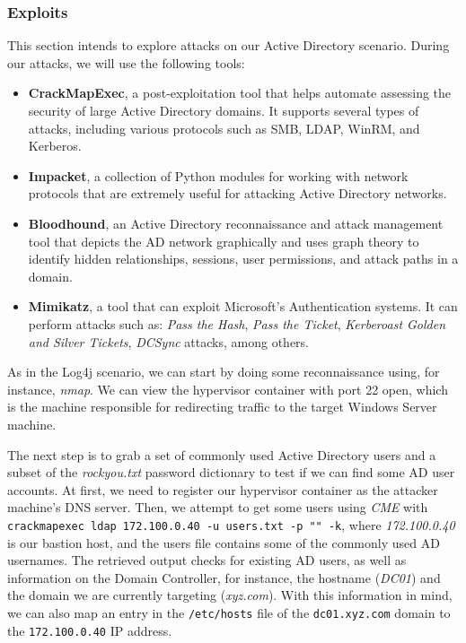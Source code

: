 \subsubsection{Exploits} \label{sec:validation_ad_exploit}

This section intends to explore attacks on our Active Directory scenario. During our attacks, we will use the following tools:

\begin{itemize}
    \item \textbf{CrackMapExec}, a post-exploitation tool that helps automate assessing the security of large Active Directory domains. It supports several types of attacks, including various protocols such as SMB, LDAP, WinRM, and Kerberos.
    \item \textbf{Impacket}, a collection of Python modules for working with network protocols that are extremely useful for attacking Active Directory networks.
    \item \textbf{Bloodhound}, an Active Directory reconnaissance and attack management tool that depicts the AD network graphically and uses graph theory to identify hidden relationships, sessions, user permissions, and attack paths in a domain.
    \item \textbf{Mimikatz}, a tool that can exploit Microsoft's Authentication systems. It can perform attacks such as: \textit{Pass the Hash}, \textit{Pass the Ticket}, \textit{Kerberoast Golden and Silver Tickets}, \textit{DCSync} attacks, among others. 
\end{itemize}

As in the Log4j scenario, we can start by doing some reconnaissance using, for instance, \textit{nmap}. We can view the hypervisor container with port 22 open, which is the machine responsible for redirecting traffic to the target Windows Server machine.

The next step is to grab a set of commonly used Active Directory users and a subset of the \textit{rockyou.txt} password dictionary to test if we can find some AD user accounts. At first, we need to register our hypervisor container as the attacker machine's DNS server. Then, we attempt to get some users using \textit{CME} with \texttt{crackmapexec ldap 172.100.0.40 -u users.txt -p "" -k}, where \textit{172.100.0.40} is our bastion host, and the users file contains some of the commonly used AD usernames. The retrieved output checks for existing AD users, as well as information on the Domain Controller, for instance, the hostname (\textit{DC01}) and the domain we are currently targeting (\textit{xyz.com}). With this information in mind, we can also map an entry in the \texttt{/etc/hosts} file of the \texttt{dc01.xyz.com} domain to the \texttt{172.100.0.40} IP address.


